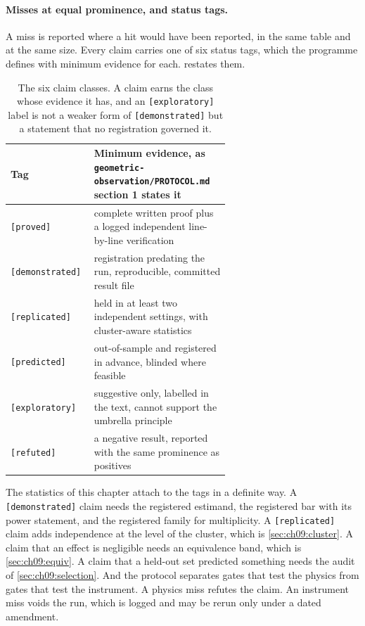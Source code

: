 \paragraph{Misses at equal prominence, and status tags.} A miss is reported where a hit would have been reported, in the same table and at the same size. Every claim carries one of six status tags, which the programme defines with minimum evidence for each.  restates them.

\begin{table}[t]
\centering\small
\begin{tabular}{@{}l p{0.62\linewidth}@{}}
\toprule
Tag & Minimum evidence, as \texttt{geometric-observation/PROTOCOL.md} section 1 states it\\
\midrule
\texttt{[proved]} & complete written proof plus a logged independent line-by-line verification\\
\texttt{[demonstrated]} & registration predating the run, reproducible, committed result file\\
\texttt{[replicated]} & held in at least two independent settings, with cluster-aware statistics\\
\texttt{[predicted]} & out-of-sample and registered in advance, blinded where feasible\\
\texttt{[exploratory]} & suggestive only, labelled in the text, cannot support the umbrella principle\\
\texttt{[refuted]} & a negative result, reported with the same prominence as positives\\
\bottomrule
\end{tabular}
\caption{The six claim classes. A claim earns the class whose evidence it has, and an \texttt{[exploratory]} label is not a weaker form of \texttt{[demonstrated]} but a statement that no registration governed it.}
\label{tab:ch09:classes}
\end{table}

The statistics of this chapter attach to the tags in a definite way. A \texttt{[demonstrated]} claim needs the registered estimand, the registered bar with its power statement, and the registered family for multiplicity. A \texttt{[replicated]} claim adds independence at the level of the cluster, which is \cref{sec:ch09:cluster}. A claim that an effect is negligible needs an equivalence band, which is \cref{sec:ch09:equiv}. A claim that a held-out set predicted something needs the audit of \cref{sec:ch09:selection}. And the protocol separates gates that test the physics from gates that test the instrument. A physics miss refutes the claim. An instrument miss voids the run, which is logged and may be rerun only under a dated amendment.

